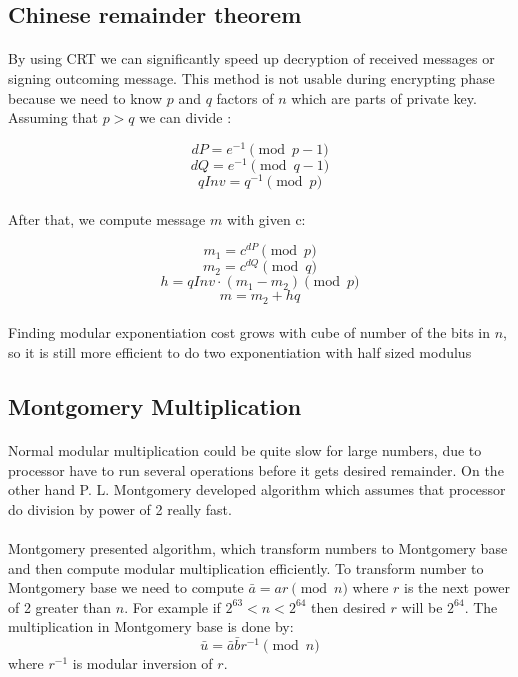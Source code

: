 \documentclass[thesis=B,english]{FITthesis}[2012/10/20]
\begin{document}
{\subsection{Chinese remainder theorem}

\paragraph*{}
{By using CRT we can significantly speed up decryption of received messages or signing outcoming message. This method is not usable during encrypting phase because we need to know \(p\) and \(q\) factors of \(n\) which are parts of private key.
Assuming that \(p>q\) we can divide :}

\[dP = e^{-1} \pmod{p-1}\]
\[dQ = e^{-1} \pmod{q-1}\]
\[qInv = q^{-1} \pmod{p}\]

\paragraph*{}
{After that, we compute message \(m\) with given c:}

\[m_1 = c^{dP} \pmod{p}\]
\[m_2 = c^{dQ} \pmod{q}\]
\[h = qInv \cdot (m_1 - m_2) \pmod{p}\]  
\[m = m_2 + hq\]

\paragraph*{}
{Finding modular exponentiation cost grows with cube of number of the bits in \(n\), so it is still more efficient to do two exponentiation with half sized modulus}



\subsection{Montgomery Multiplication}

\paragraph*{}
{Normal modular multiplication could be quite slow for large numbers, due to processor have to run several operations before it gets desired remainder. On the other hand P. L. Montgomery developed algorithm which assumes that processor do division by power of 2 really fast.}
\paragraph*{}{
Montgomery presented algorithm, which transform numbers to Montgomery base and then compute modular multiplication efficiently. To transform number to Montgomery base we need to compute \(\bar{a} = ar \pmod{n}\) where \(r\) is the next  power of 2 greater than \(n\). For example if \(2^{63} < n < 2^{64}\) then desired \(r\) will be \(2^{64}\). The multiplication in Montgomery base is done by: \[\bar{u} = \bar{a}\bar{b}r^{-1} \pmod{n}\] where \(r^{-1}\) is modular inversion of \(r\).
}
}
\end{document}
